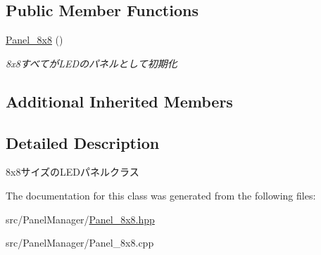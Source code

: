 \subsection*{Public Member Functions}
\begin{DoxyCompactItemize}
\item 
\mbox{\label{classPanel__8x8_af52db8ce00f41e085ef8c45371fcb6db}} 
\hyperlink{classPanel__8x8_af52db8ce00f41e085ef8c45371fcb6db}{Panel\+\_\+8x8} ()
\begin{DoxyCompactList}\small\item\em 8x8すべてが\+L\+E\+Dのパネルとして初期化 \end{DoxyCompactList}\end{DoxyCompactItemize}
\subsection*{Additional Inherited Members}


\subsection{Detailed Description}
8x8サイズの\+L\+E\+Dパネルクラス 

The documentation for this class was generated from the following files\+:\begin{DoxyCompactItemize}
\item 
src/\+Panel\+Manager/\hyperlink{Panel__8x8_8hpp}{Panel\+\_\+8x8.\+hpp}\item 
src/\+Panel\+Manager/Panel\+\_\+8x8.\+cpp\end{DoxyCompactItemize}
